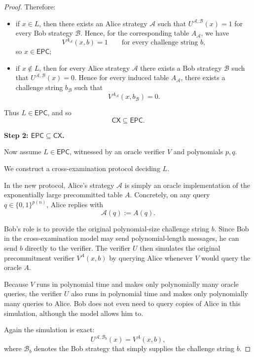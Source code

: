\documentclass[11pt]{article}
\begin{document}
\begin{proof}
Therefore:
\begin{itemize}
    \item if \(x \in L\), then there exists an Alice strategy \(\mathcal A\) such that \(U^{\mathcal A,\mathcal B}(x)=1\) for every Bob strategy \(\mathcal B\). Hence, for the corresponding table \(A_{\mathcal A}\), we have
    \[
    V^{A_{\mathcal A}}(x,b)=1
    \qquad
    \text{for every challenge string } b,
    \]
    so \(x \in \mathsf{EPC}\);
    \item if \(x \notin L\), then for every Alice strategy \(\mathcal A\) there exists a Bob strategy \(\mathcal B\) such that \(U^{\mathcal A,\mathcal B}(x)=0\). Hence for every induced table \(A_{\mathcal A}\), there exists a challenge string \(b_{\mathcal B}\) such that
    \[
    V^{A_{\mathcal A}}(x,b_{\mathcal B})=0.
    \]
\end{itemize}

Thus \(L \in \mathsf{EPC}\), and so
\[
\mathsf{CX} \subseteq \mathsf{EPC}.
\]

\medskip

\noindent\textbf{Step 2: \(\mathsf{EPC} \subseteq \mathsf{CX}\).}

Now assume \(L \in \mathsf{EPC}\), witnessed by an oracle verifier \(V\) and polynomials \(p,q\).

We construct a cross-examination protocol deciding \(L\).

In the new protocol, Alice's strategy \(\mathcal A\) is simply an oracle implementation of the exponentially large precommitted table \(A\). Concretely, on any query \(q \in \{0,1\}^{p(n)}\), Alice replies with
\[
\mathcal A(q) := A(q).
\]

Bob's role is to provide the original polynomial-size challenge string \(b\). Since Bob in the cross-examination model may send polynomial-length messages, he can send \(b\) directly to the verifier. The verifier \(U\) then simulates the original precommitment verifier \(V^A(x,b)\) by querying Alice whenever \(V\) would query the oracle \(A\).

Because \(V\) runs in polynomial time and makes only polynomially many oracle queries, the verifier \(U\) also runs in polynomial time and makes only polynomially many queries to Alice. Bob does not even need to query copies of Alice in this simulation, although the model allows him to.

Again the simulation is exact:
\[
U^{\mathcal A,\mathcal B_b}(x)=V^A(x,b),
\]
where \(\mathcal B_b\) denotes the Bob strategy that simply supplies the challenge string \(b\).


\end{proof}
\end{document}
